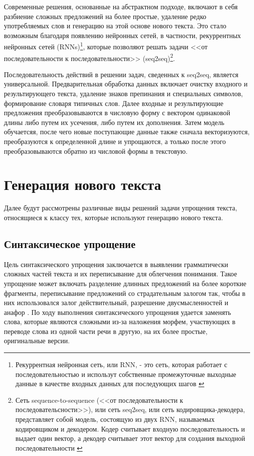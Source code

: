 Современные решения, основанные на абстрактном подходе,  включают в себя разбиение сложных предложений на более простые, удаление редко употребляемых слов и генерацию на этой основе нового текста. Это стало возможным благодаря появлению нейронных сетей, в частности, рекуррентных нейронных сетей (RNNs)\footnote{Рекуррентная нейронная сеть, или RNN, - это сеть, которая работает с последовательностью и использут собственные промежуточные выходные данные в качестве входных данных для последующих шагов \cite{noauthor_nlp_nodate}}, которые позволяют решать задачи <<от последовательности к последовательности>> (seq2seq)\footnote{Сеть sequence-to-sequence (<<от последовательности к последовательсности>>), или сеть seq2seq, или сеть кодировщика-декодера, представляет собой модель, состоящую из двух RNN, называемых кодировщиком и декодером. Кодер считывает входную последовательность и выдает один вектор, а декодер считывает этот вектор для создания выходной последовательности \cite{noauthor_nlp_nodate}}.

Последовательность действий в решении задач, сведенных к seq2seq, является универсальной. Предварительная обработка данных включает очистку входного и результирующего текста, удаление знаков препинания и специальных символов, формирование словаря типичных слов. Далее входные и результирующие предложения преобразовываются в числовую форму с вектором одинаковой длины либо путем их усечения, либо путем их дополнения. Затем модель обучаетсяя, после чего новые поступающие данные также сначала векторизуются, преобразуются к определенной длине и упрощаются, а только после этого преобразовываются обратно из числовой формы в текстовую.


\section{Генерация нового текста}

Далее будут рассмотрены различные виды решений задачи упрощения текста, относящиеся к классу тех, которые используют генерацию нового текста.

\subsection{Синтаксическое упрощение}

Цель синтаксического упрощения заключается в выявлении грамматически сложных частей текста и их переписывание для облегчения понимания. Такое упрощение может включать разделение длинных предложений на более короткие фрагменты, переписывание предложений со страдательным залогом так, чтобы в них использовался залог действительный\footnotemark{}, разрешение двусмысленностей и анафор \cite{shardlow_survey_2014}. По ходу выполнения синтаксического упрощения удается заменять слова, которые являются сложными из-за наложения морфем, участвующих в переводе слова из одной части речи в другую, на их более простые, оригинальные версии.

